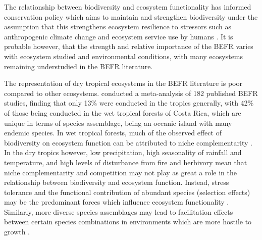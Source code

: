 \documentclass[11pt,a4paper]{article}
\begin{document}
The relationship between biodiversity and ecosystem functionality has informed conservation policy which aims to maintain and strengthen biodiversity under the assumption that this strengthens ecosystem resilience to stressors such as anthropogenic climate change and ecosystem service use by humans \citep{Thompson2011}. It is probable however, that the strength and relative importance of the BEFR varies with ecosystem studied and environmental conditions, with many ecosystems remaining understudied in the BEFR literature.

The representation of dry tropical ecosystems in the BEFR literature is poor compared to other ecosystems. \citet{Clarke2017} conducted a meta-analysis of 182 published BEFR studies, finding that only 13\% were conducted in the tropics generally, with 42\% of those being conducted in the wet tropical forests of Costa Rica, which are unique in terms of species assemblage, being an oceanic island with many endemic species. In wet tropical forests, much of the observed effect of biodiversity on ecosystem function can be attributed to niche complementarity \citep{Wright2017, Poorter2015, Sande2017a}. In the dry tropics however, low precipitation, high seasonality of rainfall and temperature, and high levels of disturbance from fire and herbivory mean that niche complementarity and competition may not play as great a role in the relationship between biodiversity and ecosystem function. Instead, stress tolerance and the functional contribution of abundant species (selection effects) may be the predominant forces which influence ecosystem functionality \citep{Lasky2014, Tobner2016}. Similarly, more diverse species assemblages may lead to facilitation effects between certain species combinations in environments which are more hostile to growth \citep{Ratcliffe2017}.
\end{document}
